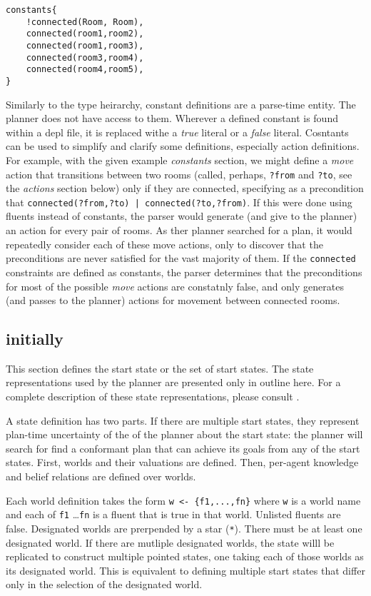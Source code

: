 \documentclass{article}
\begin{document}
\begin{verbatim}
constants{
    !connected(Room, Room),
    connected(room1,room2),
    connected(room1,room3),
    connected(room3,room4),
    connected(room4,room5),
}
\end{verbatim}

Similarly to the type heirarchy, constant definitions are a parse-time entity.
The planner does not have access to them.
Wherever a defined constant is found within a depl file, it is replaced withe a
\emph{true} literal or a
\emph{false} literal.  Cosntants can be used to simplify and clarify some definitions,
especially action definitions. For example, with the given example
\emph{constants} section, we might define a \emph{move} action that transitions
between two rooms (called, perhaps, \verb|?from| and \verb|?to|, see the
\emph{actions} section below) only if they are connected, specifying as a
precondition that \verb"connected(?from,?to) | connected(?to,?from)".  If this
were done using fluents instead of constants,
the parser would generate (and give to the planner) an
action for every pair of rooms. As ther planner searched for a plan, it
would repeatedly consider each of these move actions, only to discover that the
preconditions are never satisfied for the vast majority of them. If
the \verb|connected| constraints are defined as constants, the parser determines that
the preconditions for most of the possible \emph{move} actions are constatnly
false, and only generates (and passes to the planner) actions for movement
between connected rooms.



\subsection{initially}

This section defines the start state or the set of start states.
The state representations used by the planner are presented only in outline
here. For a complete description of these state representations, please
consult . 

A state definition has two parts.
If there are multiple start states, they represent
plan-time uncertainty of the of the planner about the start state: the planner
will search for find a conformant plan that can achieve its goals from any of
the start states.
First, worlds and their valuations are
defined. Then, per-agent knowledge and belief relations are defined over worlds.

Each world definition takes the form
\verb|w <- {f1,...,fn}|
where \verb|w| is a world name
and each of \verb|f1| \ldots \verb|fn| is a fluent 
that is true in that world. Unlisted fluents are false.
Designated worlds are prerpended by a star (\verb|*|).
There must be at least one designated world. 
If there are mutliple designated worlds, the state willl be replicated to
construct multiple pointed states, one taking each of those worlds as its
designated world. This is equivalent to defining multiple start states that
differ only in the selection of the designated world.
\end{document}
